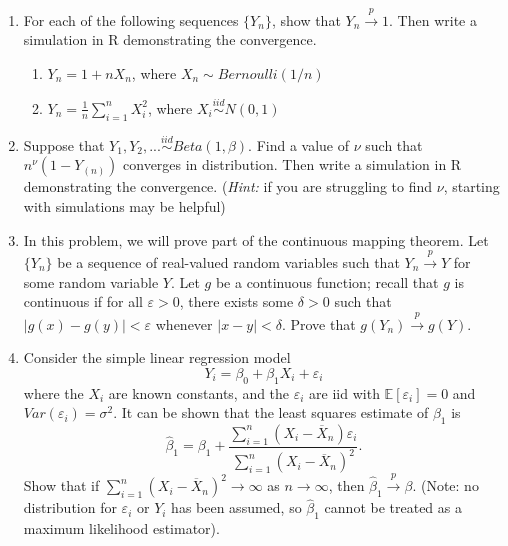 \documentclass[11pt]{article}
\begin{document}
\begin{enumerate}
\item For each of the following sequences $\{Y_n\}$, show that $Y_n \overset{p}{\to} 1$. Then write a simulation in R demonstrating the convergence.
\begin{enumerate}
\item $Y_n = 1 + n X_n$, where $X_n \sim Bernoulli(1/n)$

\item $Y_n = \frac{1}{n} \sum \limits_{i=1}^n X_i^2$, where $X_i \overset{iid}{\sim} N(0, 1)$
\end{enumerate}

\item Suppose that $Y_1, Y_2,... \overset{iid}{\sim} Beta(1, \beta)$. Find a value of $\nu$ such that $n^{\nu}(1 - Y_{(n)})$ converges in distribution. Then write a simulation in R demonstrating the convergence. (\textit{Hint:} if you are struggling to find $\nu$, starting with simulations may be helpful)


\item In this problem, we will prove part of the continuous mapping theorem. Let $\{Y_n\}$ be a sequence of real-valued random variables such that $Y_n \overset{p}{\to} Y$ for some random variable $Y$. Let $g$ be a continuous function; recall that $g$ is continuous if for all $\varepsilon > 0$, there exists some $\delta > 0$ such that $|g(x) - g(y)| < \varepsilon$ whenever $|x - y| < \delta$. Prove that $g(Y_n) \overset{p}{\to} g(Y)$.

\item Consider the simple linear regression model
$$Y_i = \beta_0 + \beta_1 X_i + \varepsilon_i$$
where the $X_i$ are known constants, and the $\varepsilon_i$ are iid with $\mathbb{E}[\varepsilon_i] = 0$ and $Var(\varepsilon_i) = \sigma^2$. It can be shown that the least squares estimate of $\beta_1$ is
$$\widehat{\beta}_1 = \beta_1 + \dfrac{\sum \limits_{i=1}^n (X_i - \overline{X}_n) \varepsilon_i}{\sum \limits_{i=1}^n (X_i - \overline{X}_n)^2}.$$
Show that if $\sum \limits_{i=1}^n (X_i - \overline{X}_n)^2 \to \infty$ as $n \to \infty$, then $\widehat{\beta}_1 \overset{p}{\to} \beta$. (Note: no distribution for $\varepsilon_i$ or $Y_i$ has been assumed, so $\widehat{\beta}_1$ cannot be treated as a maximum likelihood estimator).

\end{enumerate}
\end{document}
